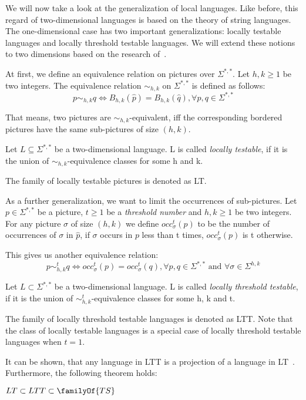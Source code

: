 We will now take a look at the generalization of local languages. Like before, this regard of two-dimensional languages is based on the theory of string languages. The one-dimensional case has two important generalizations: locally testable languages and locally threshold testable languages. We will extend these notions to two dimensions based on the research of~\cite{giammarresi1997twodimensional}. 

At first, we define an equivalence relation on pictures over $\Sigma^{*, *}$. Let $h,k \geq 1$ be two integers. The equivalence relation $\sim_{h, k}$ on $\Sigma^{*, *}$ is defined as follows: \[p \sim_{h, k} q \Leftrightarrow B_{h, k}(\hat{p}) = B_{h, k}(\hat{q}), \forall p, q \in \Sigma^{*, *}\]

That means, two pictures are $\sim_{h, k}$-equivalent, iff the corresponding bordered pictures have the same sub-pictures of size $(h, k)$. 

\begin{definition}
	Let $L \subseteq \Sigma^{*, *}$ be a two-dimensional language. L is called \emph{locally testable}, if it is the
	union of $\sim_{h, k}$-equivalence classes for some h and k.
\end{definition}

The family of locally testable pictures is denoted as LT. 

As a further generalization, we want to limit the occurrences of sub-pictures. Let $p \in \Sigma^{*, *}$ be a picture, $t \geq 1$ be a \emph{threshold number} and $h, k \geq 1$ be two integers. For any picture $\sigma$ of size $(h, k)$ we define $occ_\sigma^t(p)$ to be the number of occurrences of $\sigma$ in $\hat{p}$, if $\sigma$ occurs in $p$ less than t times,  $occ_\sigma^t(p)$ is t otherwise. 

This gives us another equivalence relation: \[p \sim_{h, k}^t q \Leftrightarrow occ_\sigma^t(p) = occ_\sigma^t(q), \forall p, q \in \Sigma^{*, *} \text{ and } \forall \sigma \in \Sigma^{h, k}\]

\begin{definition}
	Let $L \subset \Sigma^{*, *}$ be a two-dimensional language. L is called \emph{locally threshold testable}, if it is the union of $\sim_{h, k}^t$-equivalence classes for some h, k and t. 
\end{definition}

The family of locally threshold testable languages is denoted as LTT. Note that the class of locally testable languages is a special case of locally threshold testable languages when $t = 1$. 

It can be shown, that any language in LTT is a projection of a language in LT~\cite{giammarresi1997twodimensional}. Furthermore, the following theorem holds: 

\begin{theorem}
	$LT \subset LTT \subset \familyOf{TS}$
\end{theorem}